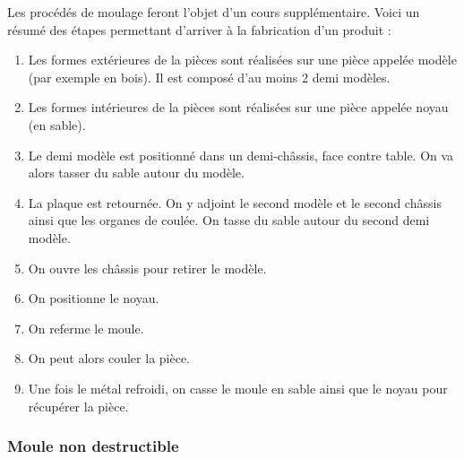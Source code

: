 \documentclass[11pt,oneside]{article}
\begin{document}
Les procédés de moulage feront l'objet d'un cours supplémentaire. Voici un résumé des étapes permettant d'arriver à la fabrication d'un produit : 
\begin{enumerate}
\item Les formes extérieures de la pièces sont réalisées sur une pièce appelée modèle (par exemple en bois). Il est composé d'au moins 2 demi modèles.
\item Les formes intérieures de la pièces sont réalisées sur une pièce appelée noyau (en sable).
\item Le demi modèle est positionné dans un demi-châssis, face contre table. On va alors tasser du sable autour du modèle.
\item La plaque est retournée. On y adjoint le second modèle et le second châssis ainsi que les organes de coulée. On tasse du sable autour du second demi modèle.
\item On ouvre les châssis pour retirer le modèle. 
\item On positionne le noyau. 
\item On referme le moule. 
\item On peut alors couler la pièce.
\item Une fois le métal refroidi, on casse le moule en sable ainsi que le noyau pour récupérer la pièce.
\end{enumerate}




\subsubsection{Moule non destructible}
\end{document}
